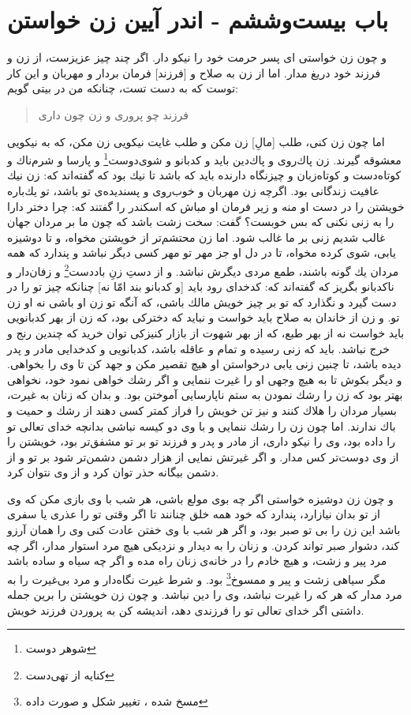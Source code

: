 \section*{باب بیست‌و‌ششم - اندر آیین زن خواستن}

و چون زن خواستى اى پسر حرمت خود را نيكو دار. اگر چند چيز عزيزست، از زن و فرزند خود دريغ مدار. اما از زن به صلاح و [فرزند] فرمان‌ بردار و مهربان و اين كار توست كه به دست تست، چنانكه من در بيتى گويم: 

\begin{quote}
فرزند چو پرورى و زن چون دارى
\end{quote}

اما چون زن كنى، طلب [مالِ] زن مكن و طلب غايت نيكويى زن مكن، كه به نيكويى معشوقه گيرند. زن پاك‌روى و پاك‌دين بايد و كدبانو و شوى‌دوست\footnote{شوهر دوست}  و پارسا و شرم‌ناك و كوتاه‌دست و كوتاه‌زبان و چيز‌نگاه دارنده بايد كه باشد تا نيك بود كه گفته‌اند كه: زن نيك عافيت زندگانى بود. اگر‌چه زن مهربان و خوب‌روى و پسنديده‌ی تو باشد، تو يك‌باره خويشتن را در دست او منه و زير فرمان او مباش كه اسكندر را گفتند كه: چرا دختر دارا را به زنى نكنى كه بس خوبست‌؟ گفت: سخت زشت باشد كه چون ما بر مردان جهان غالب شديم زنى بر ما غالب شود. اما زن محتشم‌تر از خويشتن مخواه، و تا دوشيزه يابى، شوى كرده مخواه، تا در دل او جز مهر تو مهر كسى ديگر نباشد و پندارد كه همه مردان يك گونه باشند، طمع مردى ديگرش نباشد. و از دستِ زنِ باد‌دست\footnote{کنایه از تهی‌دست}  و زفان‌دار و ناكدبانو بگريز كه گفته‌اند كه: كدخداى رود بايد [و كدبانو بند امّا نه] چنانكه چيز تو را در دست گيرد و نگذارد كه تو بر چيز خويش مالك باشى، كه آنگه تو زن او باشى نه او زن تو. و زن از خاندان به صلاح بايد خواست و نبايد كه دختركى بود، كه زن از بهر كدبانويى بايد خواست نه از بهر طبع، كه از بهر شهوت از بازار كنيزكى توان خريد كه چندين رنج و خرج نباشد. بايد كه زنى رسيده و تمام و عاقله باشد، كدبانويى و كدخدايى مادر و پدر ديده باشد، تا چنين زنى يابى درخواستن او هيچ تقصير مكن و جهد كن تا وى را بخواهى. و ديگر بكوش تا به هيچ وجهى او را غيرت ننمايى و اگر رشك خواهى نمود خود، نخواهى بهتر بود كه زن را رشك نمودن به ستم ناپارسايى آموختن بود. و بدان كه زنان به غيرت، بسيار مردان را هلاك كنند و نيز تن خويش را فراز كمتر كسى دهند از رشك و حميت و باك ندارند. اما چون زن را رشك ننمايى و با وى دو كيسه نباشى بدانچه خداى تعالی تو را داده بود، وى را نيكو دارى، از مادر و پدر و فرزند تو بر تو مشفق‌تر بود، خويشتن را از وى دوست‌تر كس مدار. و اگر غيرتش نمايى از هزار دشمن دشمن‌تر شود بر تو و از دشمن بيگانه حذر توان كرد و از وى نتوان كرد.

و چون زن دوشيزه خواستى اگر چه بوى مولع باشى، هر شب با وى بازى مكن كه وى از تو بدان نيازارد، پندارد كه خود همه خلق چنانند تا اگر وقتى تو را عذرى يا سفرى باشد اين زن را بى تو صبر بود، و اگر هر شب با وى خفتن عادت كنى وى را همان آرزو كند، دشوار صبر تواند كردن. و زنان را به ديدار و نزديكى هيچ مرد استوار مدار، اگر چه مرد پير و زشت، و هيچ خادم را در خانه‌ی زنان راه مده و اگر چه سياه و ساده باشد مگر سياهى زشت و پير و ممسوخ\footnote{مسخ شده ، تغییر شکل و صورت داده} بود. و شرط غيرت نگاه‌دار و مرد بى‌غيرت را به مرد مدار
كه هر كه را غيرت نباشد، وى را دين نباشد. و چون زن خويشتن را برين جمله داشتى اگر خداى تعالى تو را فرزندى دهد، انديشه كن به پروردن فرزند خويش.
\newpage
